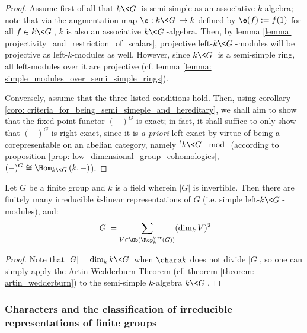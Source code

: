                 \begin{proof}
                    Assume first of all that $k\<G\>$ is semi-simple as an associative $k$-algebra; note that via the augmentation map $\e: k\<G\> \to k$ defined by $\e(f) := f(1)$ for all $f \in k\<G\>$, $k$ is also an associative $k\<G\>$-algebra. Then, by lemma \ref{lemma: projectivity_and_restriction_of_scalars}, projective left-$k\<G\>$-modules will be projective as left-$k$-modules as well. However, since $k\<G\>$ is a semi-simple ring, all left-modules over it are projective (cf. lemma \ref{lemma: simple_modules_over_semi_simple_rings}).
                    
                    Conversely, assume that the three listed conditions hold. Then, using corollary \ref{coro: criteria_for_being_semi_simeple_and_hereditary}, we shall aim to show that the fixed-point functor $(-)^G$ is exact; in fact, it shall suffice to only show that $(-)^G$ is right-exact, since it is \textit{a priori} left-exact by virtue of being a corepresentable on an abelian category, namely ${}^lk\<G\>\mod$ (according to proposition \ref{prop: low_dimensional_group_cohomologies}, $(-)^G \cong \Hom_{k\<G\>}(k, -)$).  
                \end{proof}
            \begin{example}
                
            \end{example}
            \begin{corollary} \label{coro: sum_of_squares_formula_for_finite_groups}
                Let $G$ be a finite group and $k$ is a field wherein $|G|$ is invertible. Then there are finitely many irreducible $k$-linear representations of $G$ (i.e. simple left-$k\<G\>$-modules), and:
                    $$|G| = \sum_{V \in \Ob(\Rep_k^{\irr}(G))} (\dim_k V)^2$$
            \end{corollary}
                \begin{proof}
                    Note that $|G| = \dim_k k\<G\>$ when $\chara k$ does not divide $|G|$, so one can simply apply the Artin-Wedderburn Theorem (cf. theorem \ref{theorem: artin_wedderburn}) to the semi-simple $k$-algebra $k\<G\>$.
                \end{proof}
                
        \subsubsection{Characters and the classification of irreducible representations of finite groups}
